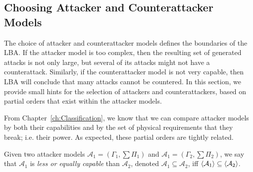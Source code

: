 {{\subsection{Choosing Attacker and Counterattacker Models}
The choice of attacker and counterattacker models defines the boundaries of the LBA. If the attacker model is too complex, then the resulting set of generated attacks is not only large, but several of its attacks might not have a counterattack. Similarly, if the counterattacker model is not very capable, then LBA will conclude that many attacks cannot be countered. In this section, we provide small hints for the selection of attackers and counterattackers, based on partial orders that exist within the attacker models.

{\color{red} From Chapter~\ref{ch:Classification}, w}e know that we can compare attacker models by both their capabilities and by the set of physical requirements that they break; i.e. their power. As expected, these partial orders are tightly related. 
\begin{definition}
  Given two attacker models $\mathcal{A}_1=(\Gamma_1,\sum \Pi_1)$ and $\mathcal{A}_1=(\Gamma_2,\sum \Pi_2)$, we say that $\mathcal{A}_1$ is \emph{less or equally capable} than $\mathcal{A}_2$, denoted $\mathcal{A}_1\subseteq \mathcal{A}_2$, iff ${{\left<\mathcal{A}_1\right>}}\subseteq {{\left<\mathcal{A}_2\right>}}$. 
  

\end{definition}}}
